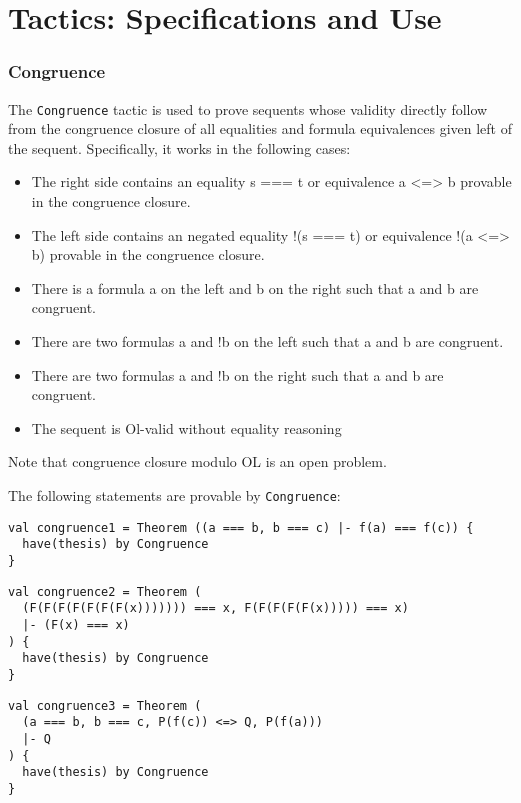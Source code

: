 \chapter{Tactics: Specifications and Use}
\label{chapt:tactics}

\subsection*{Congruence}
The \lstinline|Congruence| tactic is used to prove sequents whose validity directly follow from the congruence closure of all equalities and formula equivalences given left of the sequent.
Specifically, it works in the following cases:
\begin{itemize}
  \item The right side contains an equality s === t or equivalence a <=> b provable in the congruence closure.
  \item The left side contains an negated equality !(s === t) or equivalence !(a <=> b) provable in the congruence closure.
  \item There is a formula a on the left and b on the right such that a and b are congruent.
  \item There are two formulas a and !b on the left such that a and b are congruent.
  \item There are two formulas a and !b on the right such that a and b are congruent.
  \item The sequent is Ol-valid without equality reasoning
\end{itemize}
Note that congruence closure modulo OL is an open problem.

\begin{example}
  The following statements are provable by \lstinline|Congruence|:
\newline\begin{lstlisting}[language=lisa, frame=single]
val congruence1 = Theorem ((a === b, b === c) |- f(a) === f(c)) {
  have(thesis) by Congruence
}
\end{lstlisting}

\begin{lstlisting}[language=lisa, frame=single]
val congruence2 = Theorem (
  (F(F(F(F(F(F(F(x))))))) === x, F(F(F(F(F(x))))) === x)
  |- (F(x) === x)
) {
  have(thesis) by Congruence
}
\end{lstlisting}

\begin{lstlisting}[language=lisa, frame=single]
val congruence3 = Theorem (
  (a === b, b === c, P(f(c)) <=> Q, P(f(a)))
  |- Q
) {
  have(thesis) by Congruence
}
\end{lstlisting}

\end{example}

